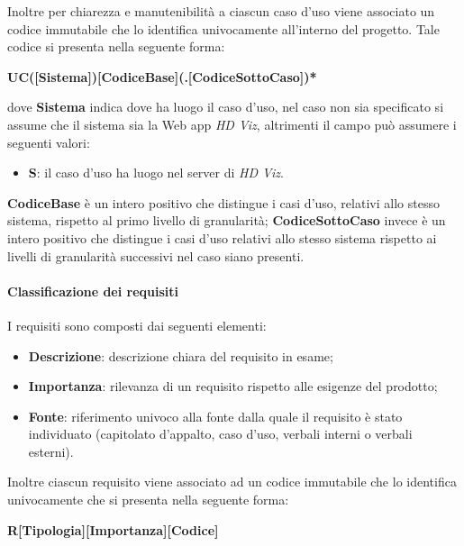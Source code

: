 Inoltre per chiarezza e manutenibilità a ciascun caso d'uso viene associato un codice immutabile che lo identifica univocamente 
all'interno del progetto. Tale codice si presenta nella seguente forma:
\begin{center}
    \textbf{UC([Sistema])[CodiceBase](.[CodiceSottoCaso])*}
\end{center}
dove \textbf{Sistema} indica dove ha luogo il caso d'uso, nel caso non sia specificato si assume che il sistema sia la Web app 
\emph{HD Viz}, altrimenti il campo può assumere i seguenti valori:
\begin{itemize}
	\item \textbf{S}: il caso d'uso ha luogo nel server di \emph{HD Viz}.
\end{itemize}
\textbf{CodiceBase} è un intero positivo che distingue i casi d'uso, relativi allo stesso sistema, rispetto al primo livello di 
granularità; \textbf{CodiceSottoCaso} invece è un intero positivo che distingue i casi d'uso relativi allo stesso sistema rispetto ai 
livelli di granularità successivi nel caso siano presenti.

\paragraph{Classificazione dei requisiti}
\label{par:classificazione_requisiti}

I requisiti sono composti dai seguenti elementi:
\begin{itemize}
	\item \textbf{Descrizione}: descrizione chiara del requisito in esame;
	\item \textbf{Importanza}: rilevanza di un requisito rispetto alle esigenze del prodotto;
	\item \textbf{Fonte}: riferimento univoco alla fonte dalla quale il requisito è stato individuato (capitolato d'appalto, caso d'uso, 
		verbali interni o verbali esterni).
\end{itemize}

Inoltre ciascun requisito viene associato ad un codice immutabile che lo identifica univocamente che si presenta nella seguente forma:
\begin{center}
    \textbf{R[Tipologia][Importanza][Codice]}
\end{center}

